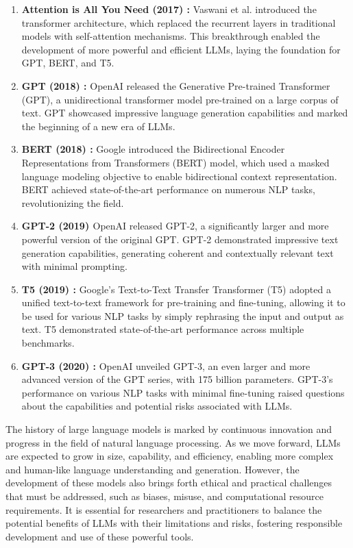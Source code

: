 \begin{enumerate}
    \item \textbf{Attention is All You Need (2017) \cite{vaswani2023attention}:} Vaswani et al. introduced the transformer architecture, which replaced the recurrent layers in traditional models with self-attention mechanisms. This breakthrough enabled the development of more powerful and efficient LLMs, laying the foundation for GPT, BERT, and T5.
    \item \textbf{GPT (2018) \cite{openai:gpt}:} OpenAI released the Generative Pre-trained Transformer (GPT), a unidirectional transformer model pre-trained on a large corpus of text. GPT showcased impressive language generation capabilities and marked the beginning of a new era of LLMs.
    \item \textbf{BERT (2018) \cite{devlin2019bert}:} Google introduced the Bidirectional Encoder Representations from Transformers (BERT) model, which used a masked language modeling objective to enable bidirectional context representation. BERT achieved state-of-the-art performance on numerous NLP tasks, revolutionizing the field.
    \item \textbf{GPT-2 (2019) \cite{radford2019language}} OpenAI released GPT-2, a significantly larger and more powerful version of the original GPT. GPT-2 demonstrated impressive text generation capabilities, generating coherent and contextually relevant text with minimal prompting.
    \item \textbf{T5 (2019) \cite{raffel2023exploring}:} Google's Text-to-Text Transfer Transformer (T5) adopted a unified text-to-text framework for pre-training and fine-tuning, allowing it to be used for various NLP tasks by simply rephrasing the input and output as text. T5 demonstrated state-of-the-art performance across multiple benchmarks.
    \item \textbf{GPT-3 (2020) \cite{brown2020language}:} OpenAI unveiled GPT-3, an even larger and more advanced version of the GPT series, with 175 billion parameters. GPT-3's performance on various NLP tasks with minimal fine-tuning raised questions about the capabilities and potential risks associated with LLMs.
\end{enumerate}

The history of large language models is marked by continuous innovation and progress in the field of natural language processing. As we move forward, LLMs are expected to grow in size, capability, and efficiency, enabling more complex and human-like language understanding and generation. However, the development of these models also brings forth ethical and practical challenges that must be addressed, such as biases, misuse, and computational resource requirements. It is essential for researchers and practitioners to balance the potential benefits of LLMs with their limitations and risks, fostering responsible development and use of these powerful tools.